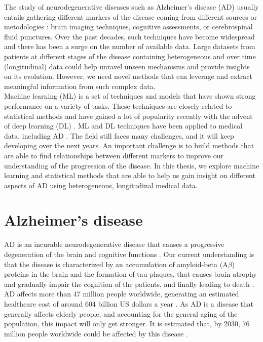 

The study of neurodegenerative diseases such as Alzheimer's disease (AD) usually entails gathering different markers of the disease coming from different sources or metodologies \cite{Jack2010}: brain imaging techniques, cognitive assessments, or cerebrospinal fluid punctures. Over the past decades, such techniques have become widespread and there has been a surge on the number of available data. Large datasets from patients at different stages of the disease containing heterogeneous and over time (longitudinal) data could help unravel unseen mechanisms and provide insights on its evolution. However, we need novel methods that can leverage and extract meaningful information from such complex data. \\

Machine learning (ML) is a set of techniques and models that have shown strong performance on a variety of tasks. These techniques are closely related to statistical methods and have gained a lot of popularity recently with the advent of deep learning (DL) \cite{LeCun2015}. ML and DL techniques have been applied to medical data, including AD \cite{Litjens2017,Ching2018}. The field still faces many challenges, and it will keep developing over the next years. An important challenge is to build methods that are able to find relationships between different markers to improve our understanding of the progression of the disease. In this thesis, we explore machine learning and statistical methods that are able to help us gain insight on different aspects of AD using heterogeneous, longitudinal medical data. \\

\section{Alzheimer's disease}

AD is an incurable neurodegenerative disease that causes a progressive degeneration of the brain and cognitive functions \cite{Lane2018}. Our current understanding is that the disease is characterized by an accumulation of amyloid-beta (A$\beta$) proteins in the brain and the formation of tau plaques, that causes brain atrophy and gradually impair the cognition of the patients, and finally leading to death \cite{Ballard2011}. AD affects more than 47 million people worldwide, generating an estimated healthcare cost of around 604 billion US dollars a year \cite{AlzheimersAssociation}. As AD is a disease that generally affects elderly people, and accounting for the general aging of the population, this impact will only get stronger. It is estimated that, by 2030, 76 million people worldwide could be affected by this disease \cite{AlzheimersAssociation}. \\

